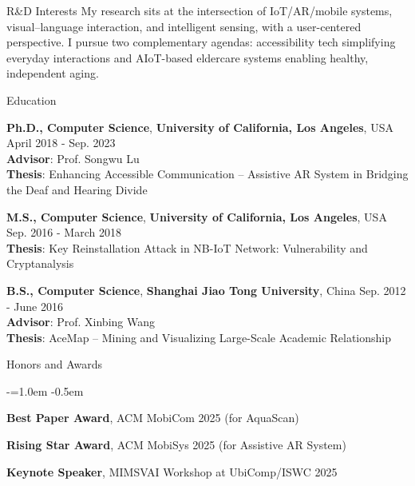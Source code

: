 \documentclass{resume} %
\begin{document}
\begin{rSection}{R\&D Interests}
    My research sits at the intersection of IoT/AR/mobile systems, visual–language interaction, and intelligent sensing, with a user-centered perspective. I pursue two complementary agendas: accessibility tech simplifying everyday interactions and AIoT-based eldercare systems enabling healthy, independent aging.
\end{rSection}

\begin{rSection}{Education}

\noindent
\textbf{Ph.D., Computer Science}, \textbf{University of California, Los Angeles}, USA \hfill April 2018 - Sep. 2023 \\
\textbf{Advisor}: Prof. Songwu Lu \\
\textbf{Thesis}: {\small Enhancing Accessible Communication -- Assistive AR System in Bridging the Deaf and Hearing Divide}
\smallskip

\noindent
\textbf{M.S., Computer Science}, \textbf{University of California, Los Angeles}, USA \hfill Sep. 2016 - March 2018 \\
\textbf{Thesis}: {\small Key Reinstallation Attack in NB-IoT Network: Vulnerability and Cryptanalysis}
\smallskip

\noindent
\textbf{B.S., Computer Science}, \textbf{Shanghai Jiao Tong University}, China \hfill Sep. 2012 - June 2016 \\
\textbf{Advisor}: Prof. Xinbing Wang \\
\textbf{Thesis}: {\small AceMap -- Mining and Visualizing Large-Scale Academic Relationship}

\end{rSection}

\begin{rSection}{Honors and Awards}
\begin{list}{-}{\leftmargin=1.0em}
\itemsep -0.5em 
    \item[-] \textbf{Best Paper Award}, ACM MobiCom 2025 (for AquaScan)
    \item[-] \textbf{Rising Star Award}, ACM MobiSys 2025 (for Assistive AR System)
    \item[-] \textbf{Keynote Speaker}, MIMSVAI Workshop at UbiComp/ISWC 2025
\end{list}
\end{rSection}

\end{document}
